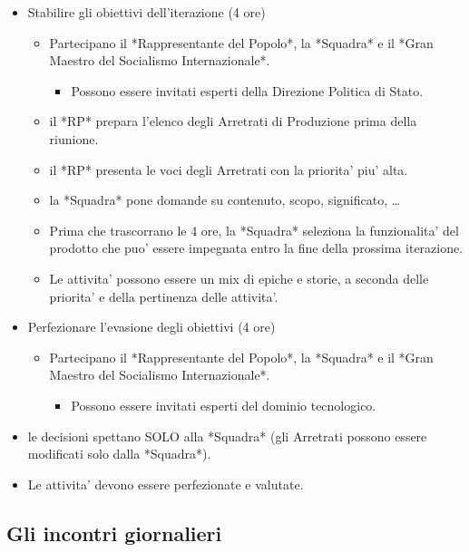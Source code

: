 \begin{itemize}
  \item Stabilire gli obiettivi dell'iterazione (4 ore)
  \begin{itemize}
    \item Partecipano il *Rappresentante del Popolo*, la *Squadra* e il *Gran Maestro del Socialismo Internazionale*.
    \begin{itemize}
      \item Possono essere invitati esperti della Direzione Politica di Stato.
    \end{itemize}
    \item il *RP* prepara l'elenco degli Arretrati di Produzione prima della riunione.
    \item il *RP* presenta le voci degli Arretrati con la priorita' piu' alta.
    \item la *Squadra* pone domande su contenuto, scopo, significato, …
    \item Prima che trascorrano le 4 ore, la *Squadra* seleziona la funzionalita' del prodotto che puo' essere impegnata entro la fine della prossima iterazione.
    \item Le attivita' possono essere un mix di epiche e storie, a seconda delle priorita' e della pertinenza delle attivita'.
  \end{itemize}
  \item Perfezionare l'evasione degli obiettivi (4 ore)
  \begin{itemize}
    \item Partecipano il *Rappresentante del Popolo*, la *Squadra* e il *Gran Maestro del Socialismo Internazionale*.
    \begin{itemize}
      \item Possono essere invitati esperti del dominio tecnologico.
    \end{itemize}
  \end{itemize}
  \item le decisioni spettano SOLO alla *Squadra* (gli Arretrati possono essere modificati solo dalla *Squadra*).
  \item Le attivita' devono essere perfezionate e valutate.
\end{itemize}

\subsection{Gli incontri giornalieri}

